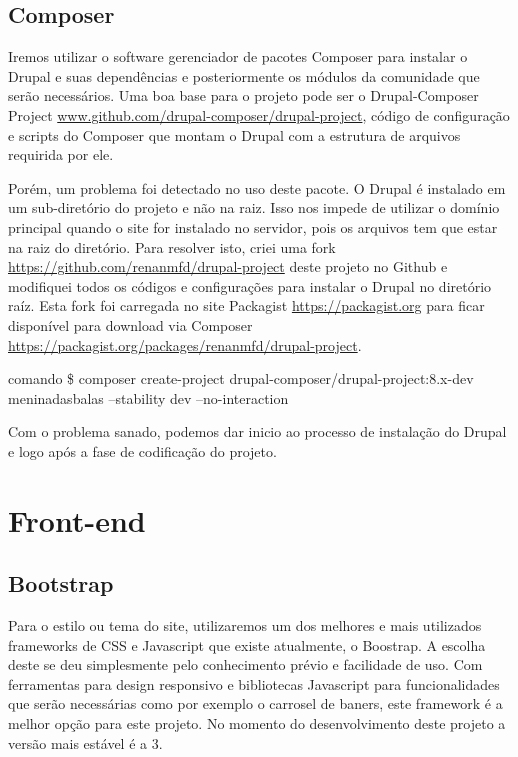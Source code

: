 \subsection{Composer}
Iremos utilizar o software gerenciador de pacotes Composer para instalar o Drupal e suas dependências e posteriormente os módulos da comunidade que serão necessários. Uma boa base para o projeto pode ser o Drupal-Composer Project \url{www.github.com/drupal-composer/drupal-project}, código de configuração e scripts do Composer que montam o Drupal com a estrutura de arquivos requirida por ele.

Porém, um problema foi detectado no uso deste pacote. O Drupal é instalado em um sub-diretório do projeto e não na raiz. Isso nos impede de utilizar o domínio principal quando o site for instalado no servidor, pois os arquivos tem que estar na raiz do diretório. Para resolver isto, criei uma fork \TODO \url{https://github.com/renanmfd/drupal-project} deste projeto no Github e modifiquei todos os códigos e configurações para instalar o Drupal no diretório raíz. Esta \TODO fork foi carregada no site Packagist \url{https://packagist.org} para ficar disponível para download via Composer \url{https://packagist.org/packages/renanmfd/drupal-project}.

\TODO comando \$ composer create-project drupal-composer/drupal-project:8.x-dev meninadasbalas --stability dev --no-interaction

Com o problema sanado, podemos dar inicio ao processo de instalação do Drupal e logo após a fase de codificação do projeto.

\section{Front-end}

\subsection{Bootstrap}
Para o estilo ou tema do site, utilizaremos um dos melhores e mais utilizados frameworks de CSS e Javascript \cite{Bootstrap} que existe atualmente, o Boostrap. A escolha deste se deu simplesmente pelo conhecimento prévio e facilidade de uso. Com ferramentas para design responsivo e bibliotecas Javascript para funcionalidades que serão necessárias como por exemplo o carrosel de baners, este framework é a melhor opção para este projeto. No momento do desenvolvimento deste projeto a versão mais estável é a 3.

